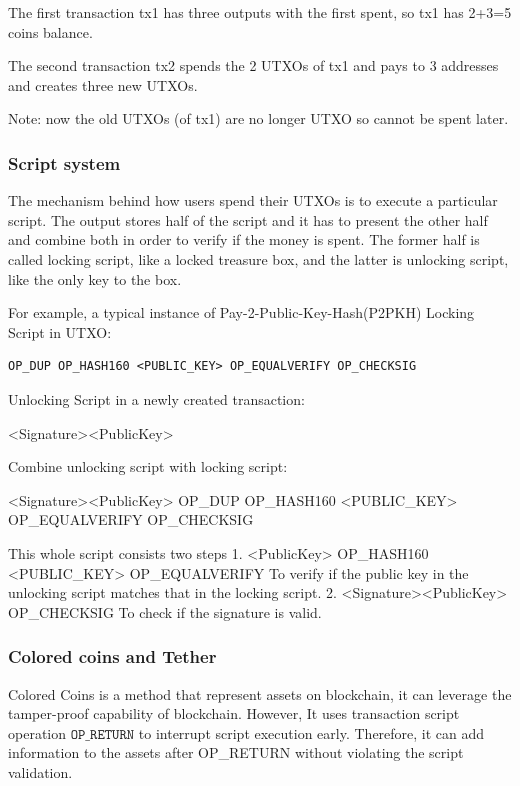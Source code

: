 \documentclass[a4paper,11pt]{article}
\begin{document}
The first transaction tx1 has three outputs with the first spent, so  tx1 has 2+3=5 coins balance.

The second transaction tx2 spends the 2 UTXOs of tx1 and pays to 3 addresses and creates three new UTXOs.

Note: now the old UTXOs (of tx1) are no longer UTXO so cannot be spent later.

\subsubsection*{Script system}

The mechanism behind how users spend their UTXOs is to execute a particular script. The output stores half of the script and it has to present the other half and combine both in order to verify if the money is spent. The former half is called locking script, like a locked treasure box, and the latter is unlocking script, like the only key to the box.

For example, a typical instance of  Pay-2-Public-Key-Hash(P2PKH)\cite{P2PKH} Locking Script in UTXO:

\begin{lstlisting}
OP_DUP OP_HASH160 <PUBLIC_KEY> OP_EQUALVERIFY OP_CHECKSIG
\end{lstlisting}

Unlocking Script in a newly created transaction:

<Signature><PublicKey>

Combine unlocking script with locking script:

<Signature><PublicKey> OP\_DUP OP\_HASH160 <PUBLIC\_KEY> OP\_EQUALVERIFY OP\_CHECKSIG

This whole script consists two steps
1. <PublicKey>  OP\_HASH160 <PUBLIC\_KEY> OP\_EQUALVERIFY
	To verify if the public key in the unlocking script matches that in the locking script.
2.  <Signature><PublicKey> OP\_CHECKSIG
	To check if the signature is valid.


\subsubsection*{Colored coins and Tether}

Colored Coins\cite{ColoredCoins} is a method that represent assets on blockchain, it can leverage the tamper-proof capability of blockchain. However, It uses transaction script operation $\texttt{OP\_RETURN}$ to interrupt script execution early. Therefore, it can add information to the assets after OP\_RETURN without violating the script validation. 
\end{document}
